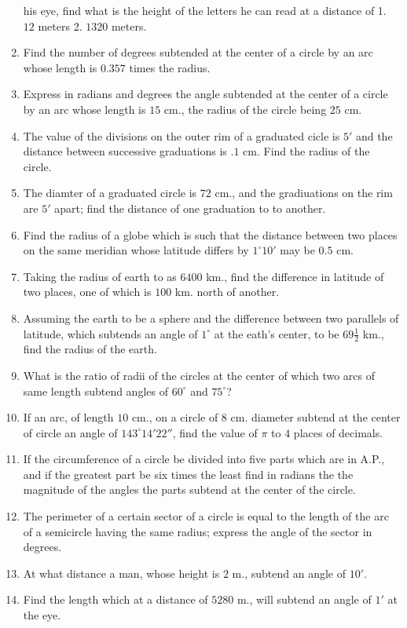 \begin{enumerate}[resume]
    his eye, find what is the height of the letters he can read at a distance of 1. $12$ meters 2. $1320$ meters.
\item Find the number of degrees subtended at the center of a circle by an arc whose length is $0.357$ times the radius.
\item Express in radians and degrees the angle subtended at the center of a circle by an arc whose length is $15$ cm., the
    radius of the circle being $25$ cm.
\item The value of the divisions on the outer rim of a graduated cicle is $5'$ and the distance between successive graduations
    is $.1$ cm. Find the radius of the circle.
\item The diamter of a graduated circle is $72$ cm., and the gradiuations on the rim are $5'$ apart; find the distance of
    one graduation to to another.
\item Find the radius of a globe which is such that the distance between two places on the same meridian whose latitude differs by
    $1^\circ10'$ may be $0.5$ cm.
\item Taking the radius of earth to as $6400$ km., find the difference in latitude of two places, one of which is $100$
    km. north of another.
\item Assuming the earth to be a sphere and the difference between two parallels of latitude, which subtends an angle of
    $1^\circ$ at the eath's center, to be $69\frac{1}{2}$ km., find the radius of the earth.
\item What is the ratio of radii of the circles at the center of which two arcs of same length subtend angles of $60^\circ$ and
    $75^\circ$?
\item If an arc, of length $10$ cm., on a circle of $8$ cm. diameter subtend at the center of circle an angle of
    $143^\circ14'22''$, find the value of $\pi$ to $4$ places of decimals.
\item If the circumference of a circle be divided into five parts which are in A.P., and if the greatest part be six times the least
    find in radians the the magnitude of the angles the parts subtend at the center of the circle.
\item The perimeter of a certain sector of a circle is equal to the length of the arc of a semicircle having the same radius; express
    the angle of the sector in degrees.
\item At what distance a man, whose height is $2$ m., subtend an angle of $10'$.
\item Find the length which at a distance of $5280$ m., will subtend an angle of $1'$ at the eye.

\end{enumerate}
